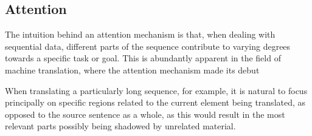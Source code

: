 \documentclass[../../fyp.tex]{subfiles}
\begin{document}




\subsection{Attention}
The intuition behind an attention mechanism is that, when dealing with sequential data, different parts of the sequence contribute to varying degrees towards a specific task or goal. This is abundantly apparent in the field of machine translation, where the attention mechanism made its debut \citep{bahdanau2014}

When translating a particularly long sequence, for example, it is natural to focus principally on specific regions related to the current element being translated, as opposed to the source sentence as a whole, as this would result in the most relevant parts possibly being shadowed by unrelated material.
\end{document}
